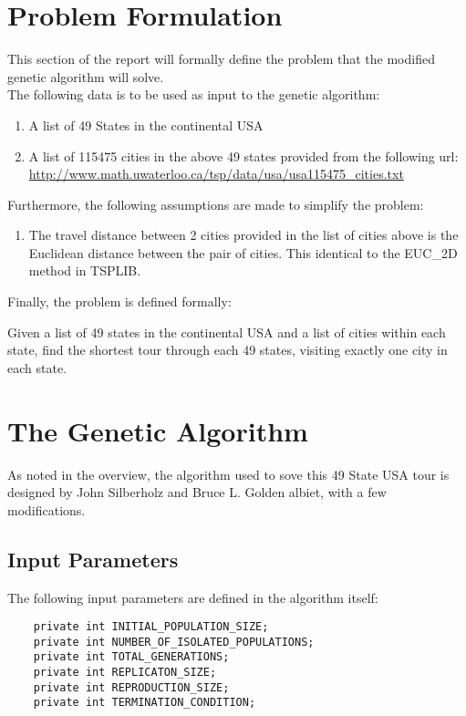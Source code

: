 \documentclass[12pt]{article}
\begin{document}
\section{Problem Formulation}

This section of the report will formally define the problem that the modified genetic algorithm will solve.\\

The following data is to be used as input to the genetic algorithm:
\begin{enumerate}
  \item A list of 49 States in the continental USA
  \item A list of 115475 cities in the above 49 states provided from the following url:\\ \url{http://www.math.uwaterloo.ca/tsp/data/usa/usa115475_cities.txt}
\end{enumerate}

Furthermore, the following assumptions are made to simplify the problem:
\begin{enumerate}
  \item The travel distance between 2 cities provided in the list of cities above is the Euclidean distance between the pair of cities. This identical to the EUC\_2D method in TSPLIB.
\end{enumerate}

Finally, the problem is defined formally:
\begin{tcolorbox}
  Given a list of 49 states in the continental USA and a list of cities within each state, find the shortest tour through each 49 states, visiting exactly one city in each state.
\end{tcolorbox}

\section{The Genetic Algorithm}

As noted in the overview, the algorithm used to sove this 49 State USA tour is designed by John Silberholz and Bruce L. Golden albiet, with a few modifications. 

\subsection{Input Parameters}
  The following input parameters are defined in the algorithm itself:
  \begin{verbatim}
    private int INITIAL_POPULATION_SIZE;
    private int NUMBER_OF_ISOLATED_POPULATIONS;
    private int TOTAL_GENERATIONS;
    private int REPLICATON_SIZE;
    private int REPRODUCTION_SIZE;
    private int TERMINATION_CONDITION;
  \end{verbatim}
\end{document}
